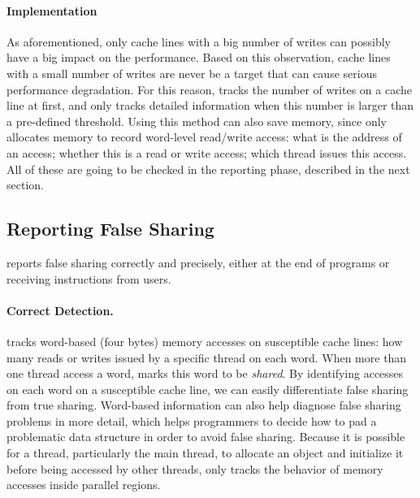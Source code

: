 
\paragraph{Implementation} 
As aforementioned, only cache lines with a big number of writes can possibly have a big impact on the performance. Based on this observation, cache lines with a small number of writes are never be a target that can cause serious performance degradation. For this reason, \Cheetah{} tracks the number of writes on a cache line at first, and only tracks detailed information when this number is larger than a pre-defined threshold. Using this method can also save memory, since \cheetah{} only allocates memory to record word-level read/write access: what is the address of an access; whether this is a read or write access; which thread issues this access. All of these are going to be checked in the reporting phase, described in the next section. 

 \subsection{Reporting False Sharing}
\label{sec:report}

\Cheetah{} reports false sharing correctly and precisely, either at the end of programs or receiving instructions from users.  

\paragraph{Correct Detection.} \Cheetah{} tracks word-based (four bytes) memory accesses on susceptible cache lines: how many reads or writes issued by a specific thread on each word. When more than one thread access a word, \Cheetah{} marks this word to be \emph{shared}. By identifying accesses on each word on a susceptible cache line, we can easily differentiate false sharing from true sharing. Word-based information can also help diagnose false sharing problems in more detail, which helps programmers to decide how to pad a problematic data structure in order to avoid false sharing. Because it is possible for a thread, particularly the main thread, to allocate an object and initialize it before being accessed by other threads, \cheetah{} only tracks the behavior of memory accesses inside parallel regions.


